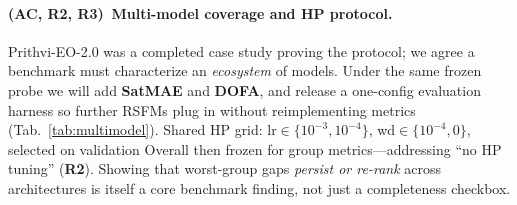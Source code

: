 \documentclass[10pt,twocolumn,letterpaper]{article}
\newcommand{\Rtwo}{\textcolor{RtwoRed}{\textbf{R2}}}
\newcommand{\Rthree}{\textcolor{RthreeGreen}{\textbf{R3}}}
\newcommand{\AC}{\textcolor{ACPurple}{\textbf{AC}}}
\begin{document}
{\vspace{-0.28em}
\paragraph{(\AC, \Rtwo, \Rthree)\, Multi-model coverage and HP protocol.}
Prithvi-EO-2.0 was a completed case study proving the protocol; we agree a benchmark must characterize an \emph{ecosystem} of models. Under the same frozen probe we will add \textbf{SatMAE} and \textbf{DOFA}, and release a one-config evaluation harness so further RSFMs plug in without reimplementing metrics (Tab.~\ref{tab:multimodel}). Shared HP grid: lr$\in\{10^{-3},10^{-4}\}$, wd$\in\{10^{-4},0\}$, selected on validation Overall then frozen for group metrics---addressing ``no HP tuning'' (\Rtwo). Showing that worst-group gaps \emph{persist or re-rank} across architectures is itself a core benchmark finding, not just a completeness checkbox.

\begin{table}[h]
\centering
\vspace{-0.35em}
\caption{Cross-RSFM evaluation under the unified frozen linear-probing protocol (3 seeds).}
\label{tab:multimodel}
\scriptsize
{}
\vspace{-0.75em}
\end{table}

\vspace{-0.28em}
}
\end{document}
